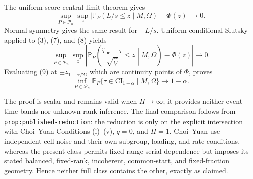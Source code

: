 The uniform-score central limit theorem gives
\[
 \sup_{P\in\mathcal P_n}\sup_z
 \left|\mathbb P_P(L/s\le z\mid M,\Omega)-\Phi(z)\right|\to0.
 \tag{8}
\]
Normal symmetry gives the same result for \(-L/s\).  Uniform conditional Slutsky applied to (3), (7), and (8) yields
\[
 \sup_{P\in\mathcal P_n}\sup_z
 \left|\mathbb P_P\!\left(
 \frac{\widehat\tau_{\mathrm{bc}}-\tau}{\sqrt{\widehat V}}
 \le z\middle|M,\Omega\right)-\Phi(z)\right|\to0.
 \tag{9}
\]
Evaluating (9) at \(\pm z_{1-\alpha/2}\), which are continuity points of \(\Phi\), proves
\[
 \inf_{P\in\mathcal P_n}
 \mathbb P_P\{\tau\in\mathrm{CI}_{1-\alpha}\mid M,\Omega\}
 \longrightarrow1-\alpha.
\]

The proof is scalar and remains valid when \(H\to\infty\); it provides neither event-time bands nor unknown-rank inference.  The final comparison follows from \texttt{prop:published-reduction}: the reduction is only on the explicit intersection with Choi--Yuan Conditions (i)--(v), \(q=0\), and \(H=1\).  Choi--Yuan use independent cell noise and their own subgroup, loading, and rate conditions, whereas the present class permits fixed-range serial dependence but imposes its stated balanced, fixed-rank, incoherent, common-start, and fixed-fraction geometry.  Hence neither full class contains the other, exactly as claimed.
